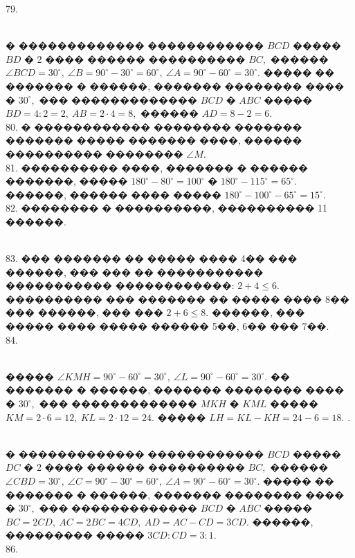 \documentclass[12pt]{article}
\begin{document}
79. \begin{figure}[ht!]
\end{figure}\\
� ������������� ������������ $BCD$ ����� $BD$ � 2 ���� ������ ���������� $BC,$ ������ $\angle BCD=30^\circ,\ \angle B=90^\circ-30^\circ=60^\circ,\ \angle A=90^\circ-60^\circ=30^\circ.$ ����� �� ������� � ������, ������� �������� ���� � $30^\circ,$ ��� ������������� $BCD$ � $ABC$ ����� $BD=4:2=2,\ AB=2\cdot4=8,$ ������  $AD=8-2=6.$\\
80. � ������������ �������� ������� ������� ����� ������� ����, ������ ���������� �������� $\angle M.$\\
81. ���������� ����, ������� � ������ �������, ����� $180^\circ-80^\circ=100^\circ$ � $180^\circ-115^\circ=65^\circ.$ ������, ������ ���� ����� $180^\circ-100^\circ-65^\circ=15^\circ.$\\
82. �������� � ����������, ���������� 11 ������.
\begin{figure}[ht!]
\end{figure}\\
83. ��� ������� �� ����� ���� 4�� ��� ������, ��� ��� �� ����������� ����������� ������������: $2+4\leqslant6.$ ���������� ��� ������� �� ����� ���� 8�� ��� ������, ��� ��� $2+6\leqslant8.$ ������, ��� ����� ���� ����� ������ 5��, 6�� ��� 7��.\\
84. \begin{figure}[ht!]
\end{figure}\\
����� $\angle KMH=90^\circ-60^\circ=30^\circ,\ \angle L=90^\circ-60^\circ=30^\circ.$ �� ������� � ������, ������� �������� ���� � $30^\circ,$ ��� ������������� $MKH$ � $KML$ ����� $KM=2\cdot6=12,\ KL=2\cdot12=24.$ ����� $LH=KL-KH=24-6=18.$\newpage
{}. \begin{figure}[ht!]
\end{figure}\\
� ������������� ������������ $BCD$ ����� $DC$ � 2 ���� ������ ���������� $BC,$ ������ $\angle CBD=30^\circ,\ \angle C=90^\circ-30^\circ=60^\circ,\ \angle A=90^\circ-60^\circ=30^\circ.$ ����� �� ������� � ������, ������� �������� ���� � $30^\circ,$ ��� ������������� $BCD$ � $ABC$ ����� $BC=2CD,\ AC=2BC=4CD,\ AD=AC-CD=3CD.$ ������, ��������� ����� $3CD:CD=3:1.$\\
86. \begin{figure}[ht!]
\end{figure}\\
\end{document}
